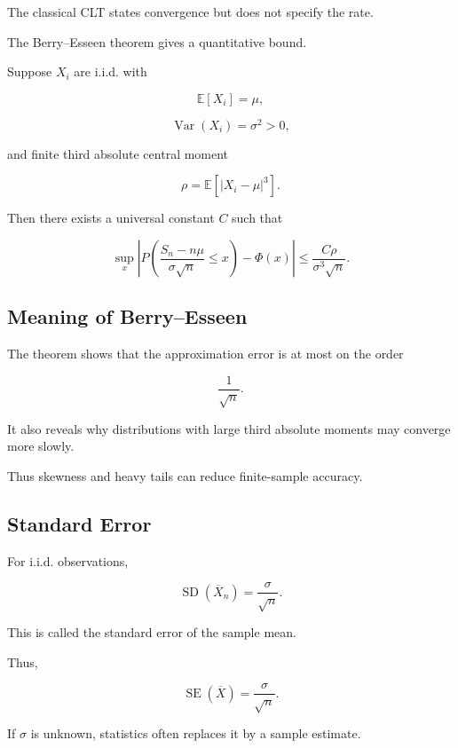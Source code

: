 The classical CLT states convergence but does not specify the rate.

The Berry--Esseen theorem gives a quantitative bound.

Suppose \(X_i\) are i.i.d. with

\[
\mathbb{E}[X_i]=\mu,
\]

\[
\operatorname{Var}(X_i)=\sigma^2>0,
\]

and finite third absolute central moment

\[
\rho
=
\mathbb{E}[|X_i-\mu|^3].
\]

Then there exists a universal constant \(C\) such that

\[
\boxed{
\sup_x
\left|
P
\left(
\frac{
S_n-n\mu
}{
\sigma\sqrt{n}
}
\leq x
\right)
-
\Phi(x)
\right|
\leq
\frac{
C\rho
}{
\sigma^3\sqrt{n}
}.
}
\]

\subsection{Meaning of Berry--Esseen}
\label{subsec:meaning-berry-esseen}

The theorem shows that the approximation error is at most on the order

\[
\boxed{
\frac1{\sqrt{n}}.
}
\]

It also reveals why distributions with large third absolute moments may
converge more slowly.

Thus skewness and heavy tails can reduce finite-sample accuracy.

\subsection{Standard Error}
\label{subsec:standard-error-clt}

For i.i.d. observations,

\[
\operatorname{SD}(\overline{X}_n)
=
\frac{\sigma}{\sqrt{n}}.
\]

This is called the standard error of the sample mean.

Thus,

\[
\boxed{
\operatorname{SE}(\overline{X})
=
\frac{\sigma}{\sqrt{n}}.
}
\]

If \(\sigma\) is unknown, statistics often replaces it by a sample
estimate.

